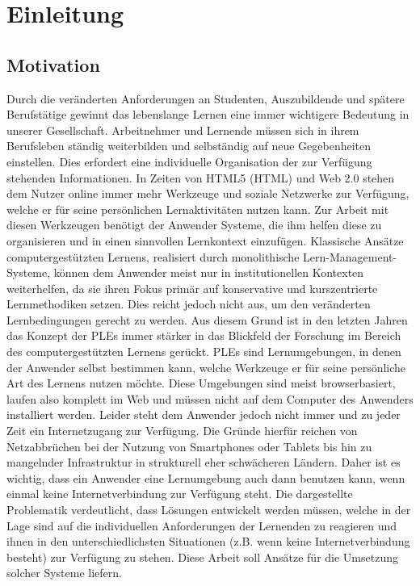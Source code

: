 \chapter{Einleitung}\label{chapter:Kapitel1}

\section{Motivation}
Durch die veränderten Anforderungen an Studenten, Auszubildende und spätere Berufstätige gewinnt das lebenslange Lernen eine immer wichtigere Bedeutung in unserer Gesellschaft. Arbeitnehmer und Lernende müssen sich in ihrem Berufsleben ständig weiterbilden und selbständig auf neue Gegebenheiten einstellen. Dies erfordert eine individuelle Organisation der zur Verfügung stehenden Informationen. In Zeiten von HTML5 (\acl{HTML})  und Web 2.0 stehen dem Nutzer online immer mehr Werkzeuge und soziale Netzwerke zur Verfügung, welche er für seine persönlichen Lernaktivitäten nutzen kann. Zur Arbeit mit diesen Werkzeugen benötigt der Anwender Systeme, die ihm helfen diese zu organisieren und in einen sinnvollen Lernkontext einzufügen. Klassische Ansätze computergestützten Lernens, realisiert durch monolithische Lern-Management-Systeme, können dem Anwender meist nur in institutionellen Kontexten weiterhelfen, da sie ihren Fokus primär auf konservative und kurszentrierte Lernmethodiken setzen. Dies reicht jedoch nicht aus, um den veränderten Lernbedingungen gerecht zu werden. Aus diesem Grund ist in den letzten Jahren das Konzept der \acp{PLE} immer stärker in das Blickfeld der Forschung im Bereich des computergestützten Lernens gerückt. \acp{PLE} sind Lernumgebungen, in denen der Anwender selbst bestimmen kann, welche Werkzeuge er für seine persönliche Art des Lernens nutzen möchte. Diese Umgebungen sind meist browserbasiert, laufen also komplett im Web und müssen nicht auf dem Computer des Anwenders installiert werden. 
Leider steht dem Anwender jedoch nicht immer und zu jeder Zeit ein Internetzugang zur Verfügung. Die Gründe hierfür reichen von Netzabbrüchen bei der Nutzung von Smartphones oder Tablets bis hin zu mangelnder Infrastruktur in strukturell eher schwächeren Ländern. Daher ist es wichtig, dass ein Anwender eine Lernumgebung auch dann benutzen kann, wenn einmal keine Internetverbindung zur Verfügung steht. Die dargestellte Problematik verdeutlicht, dass Lösungen entwickelt werden müssen, welche in der Lage sind auf die individuellen Anforderungen der Lernenden zu reagieren und ihnen in den unterschiedlichsten Situationen (z.B. wenn keine Internetverbindung besteht) zur Verfügung zu stehen. Diese Arbeit soll Ansätze für die Umsetzung solcher Systeme liefern.

